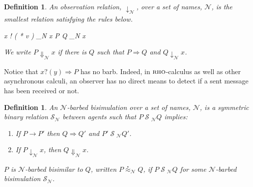 \documentclass[]{acm_proc_article-sp}
\makeatletter
\newcommand{\id}[1]{\texttt{#1}}
\newcommand{\juxtap}{\mathbin{\id{|}}}
\newcommand{\concat}{\Rightarrow}
\newcommand{\nameeq}{\mathbin{\equiv_N}}
\newcommand{\binpar}[2]{#1 \juxtap #2}
\newcommand{\outputp}[2]{#1 ! ( * #2 )}
\newcommand{\prefix}[3]{#1 ? ( #2 ) \concat #3}
\newcommand{\lift}[2]{#1 ! ( #2 )}
\newcommand{\quotep}[1]{@#1}
\newcommand{\red}{\rightarrow}
\newcommand{\wred}{\Rightarrow}
\newcommand{\rel}[1]{\;{\mathcal #1}\;} %
\newcommand{\wbbisim}{\stackrel{\centerdot}{\approx}} %
\newcommand{\fwbeq}{\stackrel{\circ}{\approx}}	%
\newtheorem{defn}[thm]{Definition}
\newtheorem{rem}[thm]{Remark}
\numberwithin{equation}{subsection}
\newcommand{\pic}{$\pi$-calculus}
\newcommand{\rhoc}{${\textsc{rho}}$-calculus}
\makeatother
\begin{document}

\begin{defn}
An \emph{observation relation}, $\downarrow_{\mathcal N}$, over a set
of names, $\mathcal N$, is the smallest relation satisfying the rules
below.

\infrule[Out-barb]{y \in {\mathcal N}, \; x \nameeq y}
		  {\outputp{x}{v} \downarrow_{\mathcal N} x}
		  {\binpar{P}{Q} \downarrow_{\mathcal N} x}

We write $P \Downarrow_{\mathcal N} x$ if there is $Q$ such that 
$P \wred Q$ and $Q \downarrow_{\mathcal N} x$.
\end{defn}

Notice that $\prefix{x}{y}{P}$ has no barb.  Indeed, in {\rhoc} as well
as other asynchronous calculi, an observer has no direct means to
detect if a sent message has been received or not.

\begin{defn}
An  ${\mathcal N}$-\emph{barbed bisimulation} over a set of names, ${\mathcal N}$, is a symmetric binary relation 
${\mathcal S}_{\mathcal N}$ between agents such that $P\rel{S}_{\mathcal N}Q$ implies:
\begin{enumerate}
\item If $P \red P'$ then $Q \wred Q'$ and $P'\rel{S}_{\mathcal N} Q'$.
\item If $P\downarrow_{\mathcal N} x$, then $Q\Downarrow_{\mathcal N} x$.
\end{enumerate}
$P$ is ${\mathcal N}$-barbed bisimilar to $Q$, written
$P \wbbisim_{\mathcal N} Q$, if $P \rel{S}_{\mathcal N} Q$ for some ${\mathcal N}$-barbed bisimulation ${\mathcal S}_{\mathcal N}$.
\end{defn}


\end{document}
